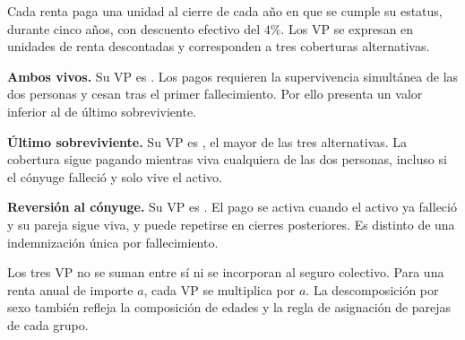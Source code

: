 Cada renta paga una unidad al cierre de cada año en que se cumple su
estatus, durante cinco años, con descuento efectivo del $4\%$.
Los VP se expresan en unidades de renta descontadas y corresponden a
tres coberturas alternativas.

\begin{table}[htbp]
\centering
\small

\caption{VP agregados para \NParejasB{} parejas admisibles.
Elaboración propia.}
\label{tab:vp-varias-vidas}
\end{table}

\begin{table}[htbp]
\centering
\small

\caption{Descomposición de los VP por sexo del activo.
Las dos filas suman el VP agregado de cada cobertura antes del redondeo.
Elaboración propia.}
\label{tab:b-vp-sexo}
\end{table}

\textbf{Ambos vivos.} Su VP es \VPambosB{}. Los pagos requieren la
supervivencia simultánea de las dos personas y cesan tras el primer
fallecimiento. Por ello presenta un valor inferior al de último sobreviviente.

\textbf{Último sobreviviente.} Su VP es \VPultimoB{}, el mayor de las
tres alternativas. La cobertura sigue pagando mientras viva cualquiera
de las dos personas, incluso si el cónyuge falleció y solo vive el activo.

\textbf{Reversión al cónyuge.} Su VP es \VPreversionB{}. El pago se
activa cuando el activo ya falleció y su pareja sigue viva, y puede
repetirse en cierres posteriores. Es distinto de una indemnización
única por fallecimiento.

Los tres VP no se suman entre sí ni se incorporan al seguro colectivo.
Para una renta anual de importe $a$, cada VP se multiplica por $a$.
La descomposición por sexo también refleja la composición de edades
y la regla de asignación de parejas de cada grupo.
